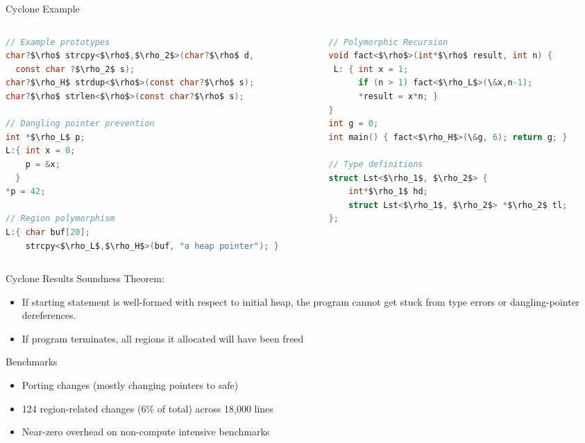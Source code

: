 \documentclass[aspectratio=169]{beamer}
\begin{document}
\begin{frame}[fragile]{Cyclone Example}
\footnotesize{
  \begin{columns}[T]
    \begin{column}{0.48\textwidth}
\begin{lstlisting}[language=C,mathescape,basicstyle={\scriptsize\ttfamily}]
// Example prototypes
char?$\rho$ strcpy<$\rho$,$\rho_2$>(char?$\rho$ d,
  const char ?$\rho_2$ s);
char?$\rho_H$ strdup<$\rho$>(const char?$\rho$ s);
char?$\rho$ strlen<$\rho$>(const char?$\rho$ s);

// Dangling pointer prevention
int *$\rho_L$ p;
L:{ int x = 0;
    p = &x;
  }
*p = 42;

// Region polymorphism
L:{ char buf[20];
    strcpy<$\rho_L$,$\rho_H$>(buf, "a heap pointer"); }
\end{lstlisting}
    \end{column}

    \begin{column}{0.48\textwidth}
\begin{lstlisting}[language=C,mathescape,basicstyle={\scriptsize\ttfamily}]
// Polymorphic Recursion
void fact<$\rho$>(int*$\rho$ result, int n) {
 L: { int x = 1;
      if (n > 1) fact<$\rho_L$>(\&x,n-1);
      *result = x*n; }
}
int g = 0;
int main() { fact<$\rho_H$>(\&g, 6); return g; }

// Type definitions
struct Lst<$\rho_1$, $\rho_2$> {
    int*$\rho_1$ hd;
    struct Lst<$\rho_1$, $\rho_2$> *$\rho_2$ tl;
};
\end{lstlisting}
    \end{column}
    \end{columns}
}
\end{frame}

\begin{frame}{Cyclone Results}
Soundness Theorem:
    \begin{itemize}
        \item If starting statement is well-formed with respect to initial heap, the program cannot get stuck from type errors or dangling-pointer dereferences. 
        \item If program terminates, all regions it allocated will have been freed
    \end{itemize}
Benchmarks
    \begin{itemize}
        \item Porting changes (mostly changing pointers to safe)
        \item 124 region-related changes (6\% of total) across 18,000 lines
        \item Near-zero overhead on non-compute intensive benchmarks %
    \end{itemize}
\end{frame}
\end{document}
